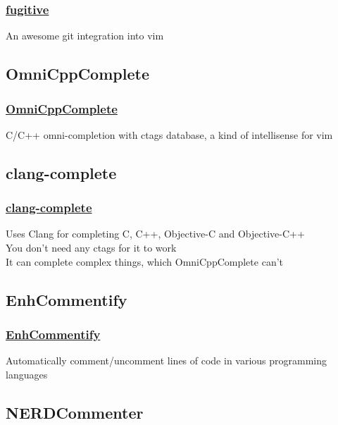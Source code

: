 \documentclass[14pt,svgnames,compress]{beamer}
\newcommand\hl[1]{\textcolor{HlColor}{#1}}
\begin{document}
\begin{frame}
    \frametitle{
        \href{git://github.com/tpope/vim-fugitive.git}
             {fugitive}
    }
    \large
    An awesome \hl{git} integration into vim \\
\end{frame}


\subsection{OmniCppComplete}

\begin{frame}
    \frametitle{
        \href{https://github.com/vim-scripts/OmniCppComplete}
             {OmniCppComplete}
    }
    \large
    C/C++ omni-completion with ctags database, a kind of intellisense for vim \\
\end{frame}


\subsection{clang-complete}

\begin{frame}
    \frametitle{
        \href{https://github.com/vim-scripts/clang-complete}
             {clang-complete}
    }
    \large
    Uses Clang for completing C, C++, Objective-C and Objective-C++ \\
    \bigskip
    You don't need any ctags for it to work \\
    \bigskip
    It can complete complex things, which OmniCppComplete can't \\
\end{frame}


\subsection{EnhCommentify}

\begin{frame}
    \frametitle{
        \href{https://github.com/vim-scripts/EnhCommentify.vim}
             {EnhCommentify}
    }
    \large
    Automatically comment/uncomment lines of code in various programming
    languages \\
\end{frame}


\subsection{NERDCommenter}
\end{document}
